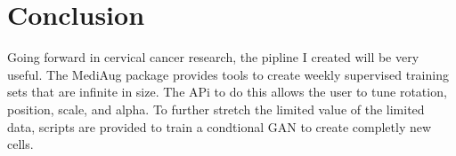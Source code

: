 \documentclass[ms,electronic,oneside,twosidetoc,letterpaper,chaptercenter,parttop]{byumsphd}
\begin{document}






\chapter{Conclusion}

Going forward in cervical cancer research, the pipline I created will be very useful.
The MediAug package provides tools to create weekly supervised training sets that are
infinite in size. The APi to do this allows the user to tune rotation, position, scale, and alpha.
To further stretch the limited value of the limited data, scripts are provided to train
a condtional GAN to create completly new cells.
\end{document}

